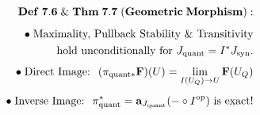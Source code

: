 \documentclass[preview]{standalone}
\begin{document}
\begin{align*}
\special{dvisvgm:raw <g id='unique000'>}\mathbf{Def\;7.6\;\&\;Thm\;7.7\;(Geometric\;Morphism):}\\[5pt]\bullet\;\text{Maximality, Pullback Stability \& Transitivity}\\\;\;\text{hold unconditionally for }J_{\text{quant}} = I^*J_{\text{syn}}.\\[4pt]\bullet\;\text{Direct Image: }\;(\pi_{\text{quant}*}\mathbf{F})(U) = \lim_{I(U_Q)\to U}\mathbf{F}(U_Q)\\[4pt]\bullet\;\text{Inverse Image: }\;\pi_{\text{quant}}^* = \mathbf{a}_{J_{\text{quant}}}(-\circ I^{\text{op}})\text{ is exact!}\special{dvisvgm:raw </g>}
\end{align*}
\end{document}

